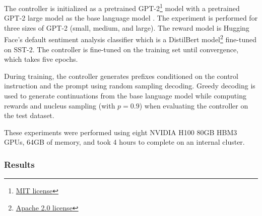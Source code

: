 \documentclass[phd,electronic,oneside,twosidetoc,letterpaper,chaptercenter,parttop,lof]{byumsphd}
\begin{document}
The controller is initialized as a pretrained GPT-2\footnote{\href{https://huggingface.co/openai-community/gpt2}{MIT license}} model with a pretrained GPT-2 large model as the base language model \citep{radford2019gpt2}.
The experiment is performed for three sizes of GPT-2 (small, medium, and large).
The reward model is Hugging Face's default sentiment analysis classifier which is a DistilBert model\footnote{\href{https://huggingface.co/distilbert/distilbert-base-uncased-finetuned-sst-2-english}{Apache 2.0 license}} \cite{sanh2019distilbert} fine-tuned on SST-2.
The controller is fine-tuned on the training set until convergence, which takes five epochs.

During training, the controller generates prefixes conditioned on the control instruction and the prompt using random sampling decoding. 
Greedy decoding is used to generate continuations from the base language model while computing rewards and nucleus sampling (with \(p=0.9\)) when evaluating the controller on the test dataset. 

These experiments were performed using eight NVIDIA H100 80GB HBM3 GPUs, 64GB of memory, and took 4 hours to complete on an internal cluster.

\subsubsection{Results}
\end{document}
